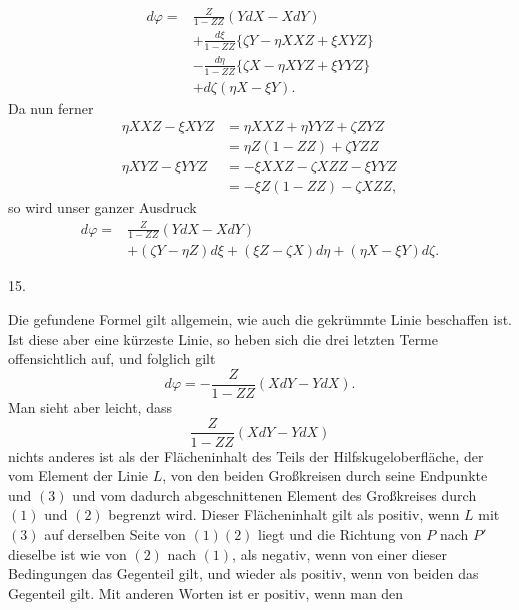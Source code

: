 %
\[
\begin{aligned}
d\varphi={}&\frac{Z}{1-ZZ}(YdX-XdY)\\
&+\frac{d\xi}{1-ZZ}\{\zeta Y-\eta XXZ+\xi XYZ\}\\
&-\frac{d\eta}{1-ZZ}\{\zeta X-\eta XYZ+\xi YYZ\}\\
&+d\zeta(\eta X-\xi Y).
\end{aligned}
\]
Da nun ferner
\[
\begin{aligned}
\eta XXZ-\xi XYZ&=\eta XXZ+\eta YYZ+\zeta ZYZ\\
&=\eta Z(1-ZZ)+\zeta YZZ\\
\eta XYZ-\xi YYZ&=-\xi XXZ-\zeta XZZ-\xi YYZ\\
&=-\xi Z(1-ZZ)-\zeta XZZ,
\end{aligned}
\]
so wird unser ganzer Ausdruck
\[
\begin{aligned}
d\varphi={}&\frac{Z}{1-ZZ}(YdX-XdY)\\
&+(\zeta Y-\eta Z)d\xi+(\xi Z-\zeta X)d\eta+(\eta X-\xi Y)d\zeta.
\end{aligned}
\]

\begin{center}15.\end{center}
\noindent\hspace*{1.2em}Die gefundene Formel gilt allgemein, wie auch die gekrümmte Linie beschaffen ist. Ist diese aber eine kürzeste Linie, so heben sich die drei letzten Terme offensichtlich auf, und folglich gilt
\[
d\varphi=-\frac{Z}{1-ZZ}(XdY-YdX).
\]
Man sieht aber leicht, dass
\[
\frac{Z}{1-ZZ}(XdY-YdX)
\]
nichts anderes ist als der Flächeninhalt des Teils der Hilfskugeloberfläche, der vom Element der Linie $L$, von den beiden Großkreisen durch seine Endpunkte und $(3)$ und vom dadurch abgeschnittenen Element des Großkreises durch $(1)$ und $(2)$ begrenzt wird. Dieser Flächeninhalt gilt als positiv, wenn $L$ mit $(3)$ auf derselben Seite von $(1)(2)$ liegt und die Richtung von $P$ nach $P'$ dieselbe ist wie von $(2)$ nach $(1)$, als negativ, wenn von einer dieser Bedingungen das Gegenteil gilt, und wieder als positiv, wenn von beiden das Gegenteil gilt. Mit anderen Worten ist er positiv, wenn man den
